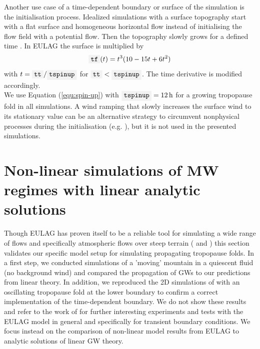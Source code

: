 Another use case of a time-dependent boundary or surface of the simulation is the initialisation process. Idealized simulations with a surface topography start with a flat surface and homogeneous horizontal flow instead of initialising the flow field with a potential flow. Then the topography slowly grows for a defined time . In EULAG the surface  is multiplied by
\begin{equation}
    \code{tf}(t) = t^3 (10 - 15t + 6t^2)
    \label{equ:spin-up}
\end{equation}
with $t = \code{tt} / \code{tspinup}$ for $\code{tt} < \code{tspinup}$. The time derivative  is modified accordingly. \\
We use Equation (\ref{equ:spin-up}) with $\code{tspinup}=\SI{12}{\hour}$ for a growing tropopause fold in all simulations. A wind ramping that slowly increases the surface wind to its stationary value can be an alternative strategy to circumvent nonphysical processes during the initialisation (e.g. \cite[]{mixa_nonlinear_2021}), but it is not used in the presented simulations.

\section{Non-linear simulations of MW regimes with linear analytic solutions}
\label{sec:linear-MWs}
Though EULAG has proven itself to be a reliable tool for simulating a wide range of flows and specifically atmospheric flows over steep terrain (\cite{prusa_eulag_2008} and \cite{doyle_intercomparison_2011}) this section validates our specific model setup for simulating propagating tropopause folds. In a first step, we conducted simulations of a 'moving' mountain in a quiescent fluid (no background wind) and compared the propagation of GWs to our predictions from linear theory. In addition, we reproduced the 2D simulations of \textcite[]{prusa_all-scale_2003} with an oscillating tropopause fold at the lower boundary to confirm a correct implementation of the time-dependent boundary. We do not show these results and refer to the work of \textcite{grogger_simulation_2022} for further interesting experiments and tests with the EULAG model in general and specifically for transient boundary conditions. We focus instead on the comparison of non-linear model results from EULAG to analytic solutions of linear GW theory. 

